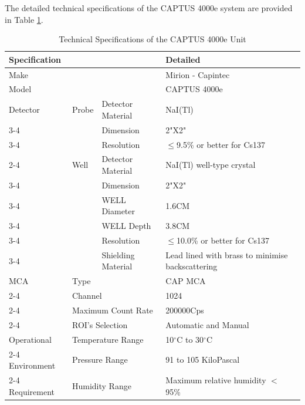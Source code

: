 The detailed technical specifications of the CAPTUS 4000e system are provided in Table \ref{tab:captus_specs}.

\begin{table}[H]
    \centering
    \renewcommand{\arraystretch}{1.3}
    \caption{Technical Specifications of the CAPTUS 4000e Unit}
    \label{tab:captus_specs}
    \begin{tabular}{|l|l|l|l|}
        \hline
        \multicolumn{3}{|l|}{\textbf{Specification}} & \textbf{Detailed} \\ \hline
        \multicolumn{3}{|l|}{Make} & Mirion - Capintec \\ \hline
        \multicolumn{3}{|l|}{Model} & CAPTUS 4000e \\ \hline
        Detector & Probe & Detector Material & NaI(Tl) \\ \cline{3-4}
         &  & Dimension & 2"X2" \\ \cline{3-4}
         &  & Resolution & $\leq$9.5\% or better for Cs137 \\ \cline{2-4}
         & Well & Detector Material & NaI(Tl) well-type crystal \\ \cline{3-4}
         &  & Dimension & 2"X2" \\ \cline{3-4}
         &  & WELL Diameter & 1.6CM \\ \cline{3-4}
         &  & WELL Depth & 3.8CM \\ \cline{3-4}
         &  & Resolution & $\leq$10.0\% or better for Cs137 \\ \cline{3-4}
         &  & Shielding Material & Lead lined with brass to minimise backscattering \\ \hline
        MCA & \multicolumn{2}{l|}{Type} & CAP MCA \\ \cline{2-4}
         & \multicolumn{2}{l|}{Channel} & 1024 \\ \cline{2-4}
         & \multicolumn{2}{l|}{Maximum Count Rate} & 200000Cps \\ \cline{2-4}
         & \multicolumn{2}{l|}{ROI's Selection} & Automatic and Manual \\ \hline
        Operational & \multicolumn{2}{l|}{Temperature Range} & 10$^\circ$C to 30$^\circ$C \\ \cline{2-4}
        Environment & \multicolumn{2}{l|}{Pressure Range} & 91 to 105 KiloPascal \\ \cline{2-4}
        Requirement & \multicolumn{2}{l|}{Humidity Range} & Maximum relative humidity $<$ 95\% \\ \hline
    \end{tabular}
\end{table}

